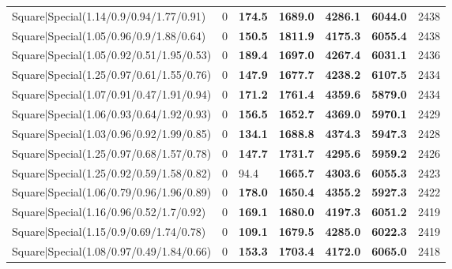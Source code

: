 \begin{tabular}{lrllllr}
 Square|Special(1.14/0.9/0.94/1.77/0.91)                       &             0   & \textbf{174.5} & \textbf{1689.0} & \textbf{4286.1} & \textbf{6044.0} &         2438 \\
 Square|Special(1.05/0.96/0.9/1.88/0.64)                       &             0   & \textbf{150.5} & \textbf{1811.9} & \textbf{4175.3} & \textbf{6055.4} &         2438 \\
 Square|Special(1.05/0.92/0.51/1.95/0.53)                      &             0   & \textbf{189.4} & \textbf{1697.0} & \textbf{4267.4} & \textbf{6031.1} &         2436 \\
 Square|Special(1.25/0.97/0.61/1.55/0.76)                      &             0   & \textbf{147.9} & \textbf{1677.7} & \textbf{4238.2} & \textbf{6107.5} &         2434 \\
 Square|Special(1.07/0.91/0.47/1.91/0.94)                      &             0   & \textbf{171.2} & \textbf{1761.4} & \textbf{4359.6} & \textbf{5879.0} &         2434 \\
 Square|Special(1.06/0.93/0.64/1.92/0.93)                      &             0   & \textbf{156.5} & \textbf{1652.7} & \textbf{4369.0} & \textbf{5970.1} &         2429 \\
 Square|Special(1.03/0.96/0.92/1.99/0.85)                      &             0   & \textbf{134.1} & \textbf{1688.8} & \textbf{4374.3} & \textbf{5947.3} &         2428 \\
 Square|Special(1.25/0.97/0.68/1.57/0.78)                      &             0   & \textbf{147.7} & \textbf{1731.7} & \textbf{4295.6} & \textbf{5959.2} &         2426 \\
 Square|Special(1.25/0.92/0.59/1.58/0.82)                      &             0   & 94.4           & \textbf{1665.7} & \textbf{4303.6} & \textbf{6055.3} &         2423 \\
 Square|Special(1.06/0.79/0.96/1.96/0.89)                      &             0   & \textbf{178.0} & \textbf{1650.4} & \textbf{4355.2} & \textbf{5927.3} &         2422 \\
 Square|Special(1.16/0.96/0.52/1.7/0.92)                       &             0   & \textbf{169.1} & \textbf{1680.0} & \textbf{4197.3} & \textbf{6051.2} &         2419 \\
 Square|Special(1.15/0.9/0.69/1.74/0.78)                       &             0   & \textbf{109.1} & \textbf{1679.5} & \textbf{4285.0} & \textbf{6022.3} &         2419 \\
 Square|Special(1.08/0.97/0.49/1.84/0.66)                      &             0   & \textbf{153.3} & \textbf{1703.4} & \textbf{4172.0} & \textbf{6065.0} &         2418 \\

\end{tabular}
